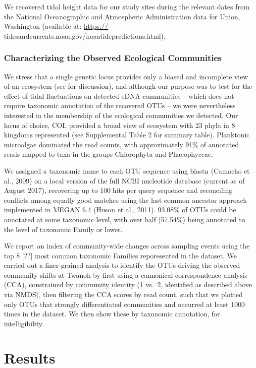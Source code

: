 \documentclass[fleqn,10pt,lineno]{wlpeerj} %
\begin{document}
We recovered tidal height data for our study sites during the relevant
dates from the National Oceanographic and Atmospheric Administration
data for Union, Washington (available at: \url{https://}
tidesandcurrents.noaa.gov/noaatidepredictions.html).

\subsubsection{Characterizing the Observed Ecological
Communities}\label{characterizing-the-observed-ecological-communities}

We stress that a single genetic locus provides only a biased and
incomplete view of an ecosystem (see \cite{Kelly_et_al_multilocus} for
discussion), and although our purpose was to test for the effect of
tidal fluctuations on detected eDNA communities -- which does not
require taxonomic annotation of the recovered OTUs -- we were
nevertheless interested in the membership of the ecological communities
we detected. Our locus of choice, COI, provided a broad view of
ecosystem with 23 phyla in 8 kingdoms represented (see Supplemental
Table 2 for summary table). Planktonic microalgae dominated the read
counts, with approximately 91\% of annotated reads mapped to taxa in the
groups Chlorophyta and Phaeophyceae.

We assigned a taxonomic name to each OTU sequence using blastn (Camacho
et al., 2009) on a local version of the full NCBI nucleotide database
(current as of August 2017), recovering up to 100 hits per query
sequence and reconciling conflicts among equally good matches using the
last common ancestor approach implemented in MEGAN 6.4 (Huson et al.,
2011). 93.08\% of OTUs could be annotated at some taxonomic level, with
over half (57.54\%) being annotated to the level of taxonomic Family or
lower.

We report an index of community-wide changes across sampling events
using the top 8 {[}??{]} most common taxonomic Families reporesented in
the dataset. We carried out a finer-grained analysis to identify the
OTUs driving the observed community shifts at Twanoh by first using a
cannonical correspondence analysis (CCA), constrained by community
identity (1 vs.~2, identified as described above via NMDS), then
filtering the CCA scores by read count, such that we plotted only OTUs
that strongly differentiated communities and occurred at least 1000
times in the dataset. We then show these by taxonomic annotation, for
intelligibility.

\section{Results}\label{results}
\end{document}
